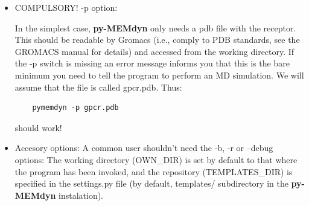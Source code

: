 \documentclass[10pt, oneside, pdftex]{article}
\begin{document}
\begin{itemize}
\item{COMPULSORY! -p option:

In the  simplest case, \textbf{py-MEMdyn}  only needs a pdb  file with
the receptor.  This should be readable by Gromacs (i.e., comply to PDB
standards, see the  GROMACS manual for details) and  accessed from the
working  directory. If  the  -p  switch is  missing  an error  message
informs you that this is the bare minimum you need to tell the program
to perform  an MD simulation. We  will assume that the  file is called
gpcr.pdb.  Thus:
\begin{Verbatim}
    pymemdyn -p gpcr.pdb
\end{Verbatim}
  should work!}

\item{Accesory options: 
A common user shouldn't need the -b,
  -r or  --debug options: The  working directory (OWN\_DIR) is  set by
  default  to  that  where  the  program has  been  invoked,  and  the
  repository  (TEMPLATES\_DIR) is  specified  in the  settings.py file  (by
  default,   templates/   subdirectory   in   the   \textbf{py-MEMdyn}
  instalation).}
  

\end{itemize}
\end{document}
